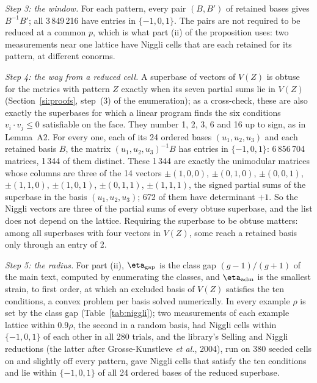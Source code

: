 \documentclass[preprint,pdf]{iucr}          %
\begin{document}
\emph{Step 3: the window.} For each pattern, every pair $(B,B')$ of retained bases gives $B^{-1}B'$; all 3\,849\,216 have entries in $\{-1,0,1\}$. The pairs are not required to be reduced at a common $p$, which is what part (ii) of the proposition uses: two measurements near one lattice have Niggli cells that are each retained for its pattern, at different conorms.

\emph{Step 4: the way from a reduced cell.} A superbase of vectors of $V(Z)$ is obtuse for the metrics with pattern $Z$ exactly when its seven partial sums lie in $V(Z)$ (Section~\ref{si:proofs}, step~(3) of the enumeration); as a cross-check, these are also exactly the superbases for which a linear program finds the six conditions $v_i\cdot v_j\le0$ satisfiable on the face. They number 1, 2, 3, 6 and 16 up to sign, as in Lemma~A2. For every one, each of its 24 ordered bases $(u_1,u_2,u_3)$ and each retained basis $B$, the matrix $(u_1,u_2,u_3)^{-1}B$ has entries in $\{-1,0,1\}$: 6\,856\,704 matrices, 1\,344 of them distinct. These 1\,344 are exactly the unimodular matrices whose columns are three of the 14 vectors $\pm(1,0,0)$, $\pm(0,1,0)$, $\pm(0,0,1)$, $\pm(1,1,0)$, $\pm(1,0,1)$, $\pm(0,1,1)$, $\pm(1,1,1)$, the signed partial sums of the superbase in the basis $(u_1,u_2,u_3)$; 672 of them have determinant $+1$. So the Niggli vectors are three of the partial sums of every obtuse superbase, and the list does not depend on the lattice. Requiring the superbase to be obtuse matters: among all superbases with four vectors in $V(Z)$, some reach a retained basis only through an entry of 2.

\emph{Step 5: the radius.} For part (ii), $\eta_{\rm gap}$ is the class gap $(g-1)/(g+1)$ of the main text, computed by enumerating the classes, and $\eta_{\rm adm}$ is the smallest strain, to first order, at which an excluded basis of $V(Z)$ satisfies the ten conditions, a convex problem per basis solved numerically. In every example $\rho$ is set by the class gap (Table~\ref{tab:niggli}); two measurements of each example lattice within $0.9\rho$, the second in a random basis, had Niggli cells within $\{-1,0,1\}$ of each other in all 280 trials, and the library's Selling and Niggli reductions (the latter after Grosse-Kunstleve \emph{et al.}, 2004), run on 380 seeded cells on and slightly off every pattern, gave Niggli cells that satisfy the ten conditions and lie within $\{-1,0,1\}$ of all 24 ordered bases of the reduced superbase.
\end{document}

